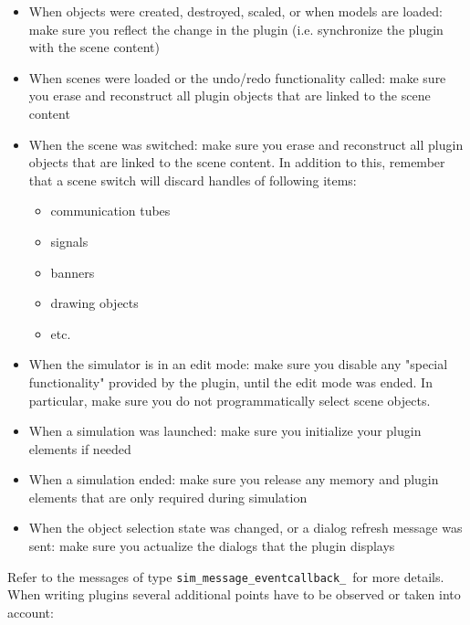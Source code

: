 \begin{itemize}[nosep]
\item 
When objects were created, destroyed, scaled, or when models are loaded: make 
sure you reflect the change in the plugin (i.e. synchronize the plugin with
the scene content)
\item 
When scenes were loaded or the undo/redo functionality called: make sure you 
erase and reconstruct all plugin objects that are linked to the scene content
\item 
When the scene was switched: make sure you erase and reconstruct all plugin 
objects that are linked to the scene content. In addition to this, remember
that a scene switch will discard handles of following items:
\begin{itemize}[nosep]
\item communication tubes
\item signals
\item banners
\item drawing objects
\item etc.
\end{itemize}
\item 
When the simulator is in an edit mode: make sure you disable any "special 
functionality" provided by the plugin, until the edit mode was ended. In 
particular, make sure you do not programmatically select scene objects.
\item 
When a simulation was launched: make sure you initialize your plugin elements 
if needed
\item 
When a simulation ended: make sure you release any memory and plugin elements
that are only required during simulation
\item 
When the object selection state was changed, or a dialog refresh message was 
sent: make sure you actualize the dialogs that the plugin displays
\end{itemize}

Refer to the messages of type \verb|sim_message_eventcallback_|\ for more 
details. When writing plugins several additional points have to be observed 
or taken into account:


